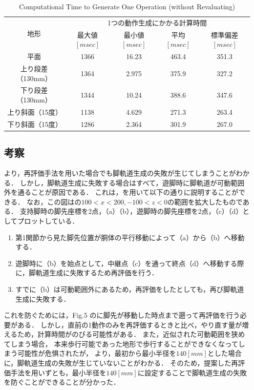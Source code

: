 \begin{table}[htbp]
  \caption{Computational Time to Generate One Operation (without Revaluating)}
  \label{tab:ch5_calc_time_140mm}  %
  \centering
  \begin{tabular}{|c||c|c|c|c|} \hline  %
    \multirow{2}{*}{地形} & \multicolumn{4}{c|}{1つの動作生成にかかる計算時間} \\ \cline{2-5}  %
     & 最大値 $[msec]$ & 最小値 $[msec]$ & 平均 $[msec]$ & 標準偏差 $[msec]$ \\ \hline \hline  %
    平面 & 1366 & 16.23 & 463.4 & 351.3 \\ \hline %
    上り段差（130mm）& 1364 & 2.975 & 375.9 & 327.2 \\ \hline %
    下り段差（130mm）& 1344 & 10.24 & 388.6 & 347.6 \\ \hline %
    上り斜面（15度） & 1138 & 4.629 & 271.3 & 263.4 \\ \hline %
    下り斜面（15度） & 1286 & 2.364 & 301.9 & 267.0 \\ \hline %
  \end{tabular}
\end{table}

\subsection{考察}
より，再評価手法を用いた場合でも脚軌道生成の失敗が生じてしまうことがわかる．
しかし，脚軌道生成に失敗する場合はすべて，遊脚時に脚軌道が可動範囲外を通ることが原因である．
これは，を用いて以下の通りに説明することができる．
なお，この図はの$100<x<200,-100<z<0$の範囲を拡大したものである．
支持脚時の脚先座標を2点，（a）（b），遊脚時の脚先座標を2点，（c）（d）としてプロットしている．

\begin{enumerate}
  \item 第1関節から見た脚先位置が胴体の平行移動によって（a）から（b）へ移動する．
  \item 遊脚時に（b）を始点として，中継点（c）を通って終点（d）へ移動する際に，脚軌道生成に失敗するため再評価を行う．
  \item すでに（b）は可動範囲外にあるため，再評価をしたとしても，再び脚軌道生成に失敗する．
\end{enumerate}

これを防ぐためには，Fig.5 のに脚先が移動した時点まで遡って再評価を行う必要がある．
しかし，直前の1動作のみを再評価するときと比べ，やり直す量が増えるため，計算時間がのびる可能性がある．
また，近似された可動範囲を狭めてしまう場合，
本来歩行可能であった地形で歩行することができなくなってしまう可能性が危惧されたが，
より，最初から最小半径を$140 [mm]$とした場合に，脚軌道生成の失敗が生じていないことがわかる．
そのため，提案した再評価手法を用いずとも，最小半径を$140 [mm]$に設定することで脚軌道生成の失敗を防ぐことができることが分かった．

